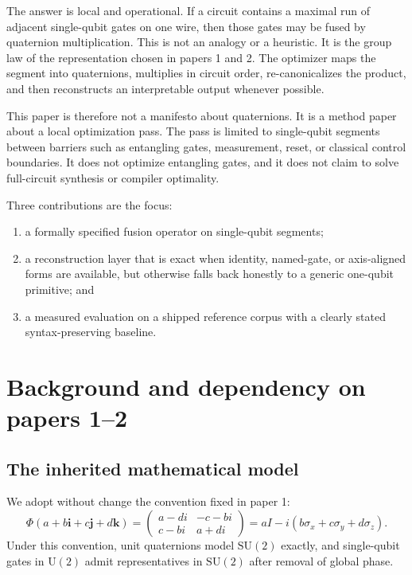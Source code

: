 \documentclass[11pt]{article}
\theoremstyle{remark}
\newcommand{\SU}{\mathrm{SU}}
\newcommand{\U}{\mathrm{U}}
\newcommand{\Id}{I}
\newcommand{\ii}{\mathbf{i}}
\newcommand{\jj}{\mathbf{j}}
\newcommand{\kk}{\mathbf{k}}
\begin{document}
The answer is local and operational. If a circuit contains a maximal run of
adjacent single-qubit gates on one wire, then those gates may be fused by
quaternion multiplication. This is not an analogy or a heuristic. It is the
group law of the representation chosen in papers 1 and 2. The optimizer maps
the segment into quaternions, multiplies in circuit order, re-canonicalizes the
product, and then reconstructs an interpretable output whenever possible.

This paper is therefore not a manifesto about quaternions. It is a method paper
about a local optimization pass. The pass is limited to single-qubit segments
between barriers such as entangling gates, measurement, reset, or classical
control boundaries. It does not optimize entangling gates, and it does not
claim to solve full-circuit synthesis or compiler optimality.

Three contributions are the focus:
\begin{enumerate}[label=(\arabic*), leftmargin=1.5em]
\item a formally specified fusion operator on single-qubit segments;
\item a reconstruction layer that is exact when identity, named-gate, or
axis-aligned forms are available, but otherwise falls back honestly to a
generic one-qubit primitive; and
\item a measured evaluation on a shipped reference corpus with a clearly stated
syntax-preserving baseline.
\end{enumerate}

\section{Background and dependency on papers 1--2}

\subsection{The inherited mathematical model}

We adopt without change the convention fixed in paper 1:
\begin{equation}
\Phi(a+b\ii+c\jj+d\kk)
=
\begin{pmatrix}
a-di & -c-bi \\
c-bi & a+di
\end{pmatrix}
=
a\Id-i(b\sigma_x+c\sigma_y+d\sigma_z).
\label{eq:phi}
\end{equation}
Under this convention, unit quaternions model $\SU(2)$ exactly, and single-qubit
gates in $\U(2)$ admit representatives in $\SU(2)$ after removal of global
phase.
\end{document}
